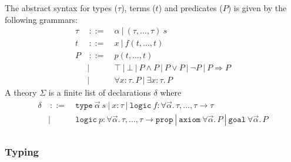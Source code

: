 \documentclass[a4paper,12pt]{report}
\begin{document}
The abstract syntax for types ($\tau$), terms ($t$) and predicates
($P$) is given by the following grammars:
\begin{displaymath}
  \begin{array}{rrl}
    \tau & ~::=~ & \alpha ~|~ (\tau,\dots,\tau)~s \\
    t & ~::=~ & x ~|~ f(t,\dots,t) \\
    P & ~::=~ & p(t,\dots,t) \\ 
      &    |~~ & \top ~|~ \bot ~|~ P \land P ~|~ P \lor P
                 ~|~ \lnot P ~|~ P\Rightarrow P \\
      &    |~~ & \forall x:\tau.\,P ~|~ \exists x:\tau.\,P
  \end{array}
\end{displaymath}
A theory $\Sigma$ is a finite list of declarations $\delta$ where
\begin{displaymath}
  \begin{array}{rrl}
  \delta & ~::=~ & 
      \texttt{type}~\vec{\alpha}~s ~|~ x:\tau ~|~
      \mathtt{logic}~f:\forall\vec{\alpha}.\,\tau,\dots,\tau\rightarrow\tau \\
         &    |~~ &   
      \mathtt{logic}~p:\forall\vec{\alpha}.\,\tau,\dots,\tau\rightarrow\mathtt{prop} ~|~ 
      \texttt{axiom}~\forall\vec{\alpha}.\,P ~|~
      \texttt{goal}~\forall\vec{\alpha}.\,P \\
  \end{array} 
\end{displaymath}

\subsubsection{Typing}

\newcommand{\Subst}[2]{\ensuremath{\mathsf{Subst}(#1,#2)}}
\end{document}
